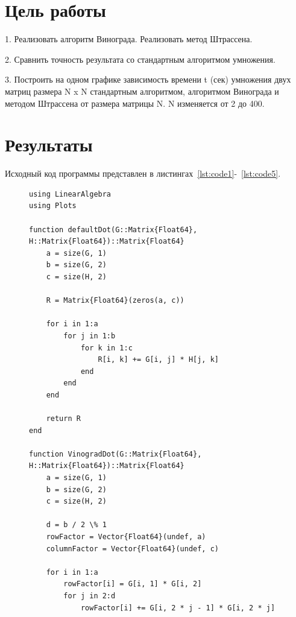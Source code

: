 \documentclass[a4paper, 14pt]{extarticle}
\begin{document}
\renewcommand{\ttdefault}{pcr}

\setlength{\tabcolsep}{3pt}
\newpage
\setcounter{page}{2}

\section{Цель работы}\label{Sect::task}

1. Реализовать алгоритм Винограда. Реализовать метод Штрассена.

2. Сравнить точность результата со стандартным алгоритмом умножения.

3. Построить на одном графике зависимость времени t (сек) умножения двух матриц размера N x N стандартным алгоритмом, алгоритмом Винограда и методом Штрассена от размера матрицы N. N изменяется от 2 до 400. 

\section{Результаты}\label{Sect::res}

Исходный код программы представлен в листингах~\ref{lst:code1}-~\ref{lst:code5}.

\begin{figure}[!htb]
\begin{lstlisting}[caption={Реализация и сравнение разных вариаций метода Гаусса},label={lst:code1}]
using LinearAlgebra
using Plots

function defaultDot(G::Matrix{Float64}, H::Matrix{Float64})::Matrix{Float64}
    a = size(G, 1)
    b = size(G, 2)
    c = size(H, 2)

    R = Matrix{Float64}(zeros(a, c))

    for i in 1:a
        for j in 1:b
            for k in 1:c
                R[i, k] += G[i, j] * H[j, k]
            end
        end
    end

    return R
end

function VinogradDot(G::Matrix{Float64}, H::Matrix{Float64})::Matrix{Float64}
    a = size(G, 1)
    b = size(G, 2)
    c = size(H, 2)

    d = b / 2 \% 1
    rowFactor = Vector{Float64}(undef, a)
    columnFactor = Vector{Float64}(undef, c)

    for i in 1:a
        rowFactor[i] = G[i, 1] * G[i, 2]
        for j in 2:d
            rowFactor[i] += G[i, 2 * j - 1] * G[i, 2 * j]
\end{lstlisting}
\end{figure}
\end{document}
